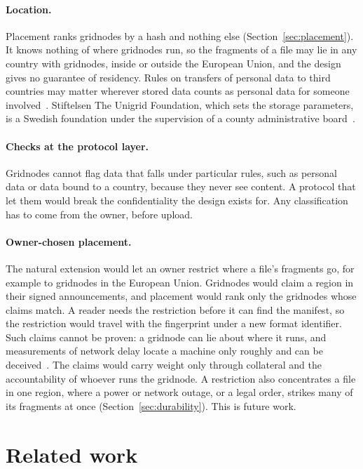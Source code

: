 \documentclass[10pt,a4paper,final]{article}
\begin{document}
\paragraph{Location.} Placement ranks gridnodes by a hash and nothing else (Section~\ref{sec:placement}). It knows
nothing of where gridnodes run, so the fragments of a file may lie in any country with gridnodes, inside or outside
the European Union, and the design gives no guarantee of residency. Rules on transfers of personal data to third
countries may matter wherever stored data counts as personal data for someone involved~\cite{gdpr2016}. Stiftelsen
The Unigrid Foundation, which sets the storage parameters, is a Swedish foundation under the supervision of a county
administrative board~\cite{stiftelselag}.

\paragraph{Checks at the protocol layer.} Gridnodes cannot flag data that falls under particular rules, such as
personal data or data bound to a country, because they never see content. A protocol that let them would break the
confidentiality the design exists for. Any classification has to come from the owner, before upload.

\paragraph{Owner-chosen placement.} The natural extension would let an owner restrict where a file's fragments go,
for example to gridnodes in the European Union. Gridnodes would claim a region in their signed announcements, and
placement would rank only the gridnodes whose claims match. A reader needs the restriction before it can find the
manifest, so the restriction would travel with the fingerprint under a new format identifier. Such claims cannot be
proven: a gridnode can lie about where it runs, and measurements of network delay locate a machine only roughly and
can be deceived~\cite{gill2010}. The claims would carry weight only through collateral and the accountability of
whoever runs the gridnode. A restriction also concentrates a file in one region, where a power or network outage,
or a legal order, strikes many of its fragments at once (Section~\ref{sec:durability}). This is future work.

\section{Related work}
\label{sec:related}
\end{document}
